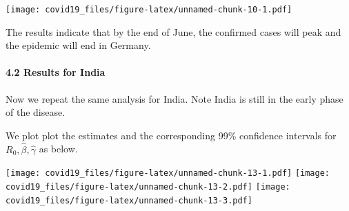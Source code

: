 \documentclass[]{article}
\newenvironment{Shaded}{\begin{snugshade}}{\end{snugshade}}
\newcommand{\DataTypeTok}[1]{\textcolor[rgb]{0.13,0.29,0.53}{#1}}
\newcommand{\DecValTok}[1]{\textcolor[rgb]{0.00,0.00,0.81}{#1}}
\newcommand{\KeywordTok}[1]{\textcolor[rgb]{0.13,0.29,0.53}{\textbf{#1}}}
\newcommand{\NormalTok}[1]{#1}
\newcommand{\OperatorTok}[1]{\textcolor[rgb]{0.81,0.36,0.00}{\textbf{#1}}}
\newcommand{\StringTok}[1]{\textcolor[rgb]{0.31,0.60,0.02}{#1}}
\let\oldparagraph\paragraph
\renewcommand{\paragraph}[1]{\oldparagraph{#1}\mbox{}}
\begin{document}
\begin{Shaded}
\end{Shaded}

\texttt{[image: covid19\_files/figure-latex/unnamed-chunk-10-1.pdf]}

The results indicate that by the end of June, the confirmed cases will
peak and the epidemic will end in Germany.

\hypertarget{results-for-india}{%
\paragraph{4.2 Results for India}\label{results-for-india}}

Now we repeat the same analysis for India. Note India is still in the
early phase of the disease.

We plot plot the estimates and the corresponding 99\% confidence
intervals for \(R_{0}, \hat{\beta}, \hat{\gamma}\) as below.

\texttt{[image: covid19\_files/figure-latex/unnamed-chunk-13-1.pdf]}
\texttt{[image: covid19\_files/figure-latex/unnamed-chunk-13-2.pdf]}
\texttt{[image: covid19\_files/figure-latex/unnamed-chunk-13-3.pdf]}
\end{document}
